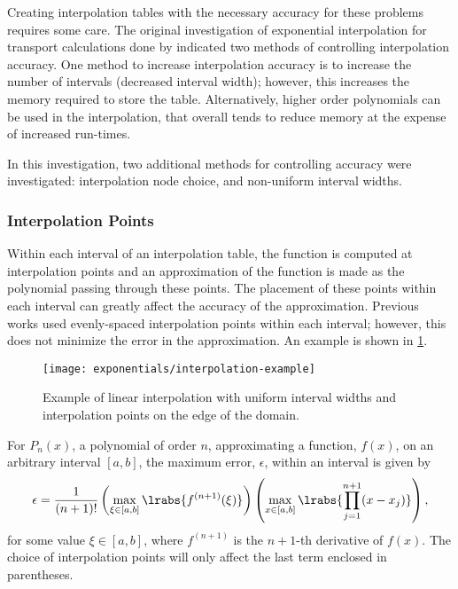{{{      Creating interpolation tables with the necessary accuracy for these problems requires some care.
      The original investigation of exponential interpolation for transport calculations  done by \citet{Yamamoto2004} indicated two methods of controlling interpolation accuracy.
      One method to increase interpolation accuracy is to increase the number of intervals (decreased interval width); however, this increases the memory required to store the table.
      Alternatively, higher order polynomials can be used in the interpolation, that overall tends to reduce memory at the expense of increased run-times.

      In this investigation, two additional methods for controlling accuracy were investigated: interpolation node choice, and non-uniform interval widths.
      \subsubsection{Interpolation Points}{\label{sssec:ET:Interpolation Points}
        Within each interval of an interpolation table, the function is computed at interpolation points and an approximation of the function is made as the polynomial passing through these points.
        The placement of these points within each interval can greatly affect the accuracy of the approximation.
        Previous works \cite{Yamamoto2004,Kochunas2013} used evenly-spaced interpolation points within each interval; however, this does not minimize the error in the approximation.
        An example is shown in \cref{fig:LSMOC:ET:Interpolation Example}.

        \begin{figure}
          \centering
          \texttt{[image: exponentials/interpolation-example]}
          \caption{Example of linear interpolation with uniform interval widths and interpolation points on the edge of the domain.\label{fig:LSMOC:ET:Interpolation Example}}
        \end{figure}

        For $P_n(x)$, a polynomial of order $n$, approximating a function, $f(x)$, on an arbitrary interval $[a,b]$, the maximum error, $\epsilon$, within an interval is given by
        \begin{equation}\label{eq:LSMOC:ET:Interpolation Error}
          \epsilon = \frac{1}{(n+1)!}\left(\max_{\xi\in[a,b]}\lrabs{f^{(n+1)}(\xi)}\right)\left(\max_{x\in[a,b]}\lrabs{\prodl[j=1][n+1](x-x_j)}\right),
        \end{equation}
        for some value $\xi\in[a,b]$, where $f^{(n+1)}$ is the $n+1$-th derivative of $f(x)$.
        The choice of interpolation points will only affect the last term enclosed in parentheses.

}}}}

